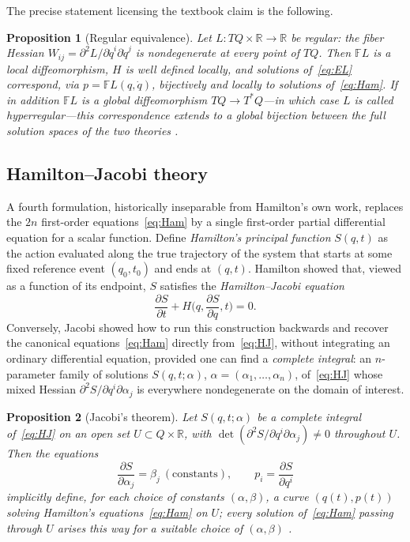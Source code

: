 \documentclass[11pt]{article}
\newtheorem{proposition}{Proposition}[section]
\newcommand{\FL}{\mathbb{F}L}
\newcommand{\dd}[2]{\frac{\partial #1}{\partial #2}}
\newcommand{\R}{\mathbb{R}}
\begin{document}
The precise statement licensing the textbook claim is the following.

\begin{proposition}[Regular equivalence]
\label{prop:regular}
Let $L: TQ\times\R\to\R$ be \emph{regular}: the fiber Hessian $W_{ij} = \partial^2 L/\partial \dot q^i \partial \dot q^j$ is nondegenerate at every point of $TQ$. Then $\FL$ is a local diffeomorphism, $H$ is well defined locally, and solutions of~\eqref{eq:EL} correspond, via $p = \FL(q,\dot q)$, bijectively and locally to solutions of~\eqref{eq:Ham}. If in addition $\FL$ is a \emph{global} diffeomorphism $TQ \to T^*Q$---in which case $L$ is called \emph{hyperregular}---this correspondence extends to a global bijection between the full solution spaces of the two theories \citep{abrahammarsden}.
\end{proposition}

\subsection{Hamilton--Jacobi theory}
\label{sec:hjtheory}

A fourth formulation, historically inseparable from Hamilton's own work, replaces the $2n$ first-order equations~\eqref{eq:Ham} by a single first-order partial differential equation for a scalar function. Define \emph{Hamilton's principal function} $S(q,t)$ as the action evaluated along the true trajectory of the system that starts at some fixed reference event $(q_0,t_0)$ and ends at $(q,t)$. Hamilton showed that, viewed as a function of its endpoint, $S$ satisfies the \emph{Hamilton--Jacobi equation}
\begin{equation}
\label{eq:HJ}
\dd{S}{t} + H\Big(q,\dd{S}{q},t\Big) = 0 .
\end{equation}
Conversely, Jacobi showed how to run this construction backwards and recover the canonical equations~\eqref{eq:Ham} directly from~\eqref{eq:HJ}, without integrating an ordinary differential equation, provided one can find a \emph{complete integral}: an $n$-parameter family of solutions $S(q,t;\alpha)$, $\alpha=(\alpha_1,\dots,\alpha_n)$, of~\eqref{eq:HJ} whose mixed Hessian $\partial^2 S/\partial q^i\partial \alpha_j$ is everywhere nondegenerate on the domain of interest.

\begin{proposition}[Jacobi's theorem]
\label{prop:jacobi-thm}
Let $S(q,t;\alpha)$ be a complete integral of~\eqref{eq:HJ} on an open set $U\subset Q\times\R$, with $\det(\partial^2 S/\partial q^i\partial\alpha_j)\neq 0$ throughout $U$. Then the equations
\begin{equation}
\dd{S}{\alpha_j} = \beta_j \ (\text{constants}), \qquad p_i = \dd{S}{q^i}
\end{equation}
implicitly define, for each choice of constants $(\alpha,\beta)$, a curve $(q(t),p(t))$ solving Hamilton's equations~\eqref{eq:Ham} on $U$; every solution of~\eqref{eq:Ham} passing through $U$ arises this way for a suitable choice of $(\alpha,\beta)$ \citep{arnold1989,goldstein2001}.
\end{proposition}
\end{document}

